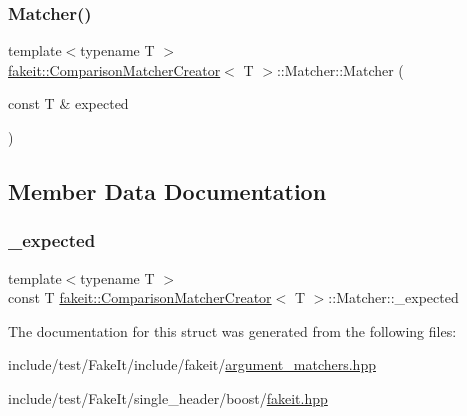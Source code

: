 \subsubsection{\texorpdfstring{Matcher()}{Matcher()}\hspace{0.1cm}{\footnotesize\ttfamily [9/9]}}
{\footnotesize\ttfamily template$<$typename T $>$ \\
\mbox{\hyperlink{structfakeit_1_1ComparisonMatcherCreator}{fakeit\+::\+Comparison\+Matcher\+Creator}}$<$ T $>$\+::Matcher\+::\+Matcher (\begin{DoxyParamCaption}\item[{const T \&}]{expected }\end{DoxyParamCaption})\hspace{0.3cm}{\ttfamily [inline]}}



\subsection{Member Data Documentation}
\mbox{\label{structfakeit_1_1ComparisonMatcherCreator_1_1Matcher_a4e97c7e911012c527daebb533d7cf2ba}} 
\subsubsection{\texorpdfstring{\_expected}{\_expected}}
{\footnotesize\ttfamily template$<$typename T $>$ \\
const T \mbox{\hyperlink{structfakeit_1_1ComparisonMatcherCreator}{fakeit\+::\+Comparison\+Matcher\+Creator}}$<$ T $>$\+::Matcher\+::\+\_\+expected}



The documentation for this struct was generated from the following files\+:\begin{DoxyCompactItemize}
\item 
include/test/\+Fake\+It/include/fakeit/\mbox{\hyperlink{argument__matchers_8hpp}{argument\+\_\+matchers.\+hpp}}\item 
include/test/\+Fake\+It/single\+\_\+header/boost/\mbox{\hyperlink{single__header_2boost_2fakeit_8hpp}{fakeit.\+hpp}}\end{DoxyCompactItemize}
